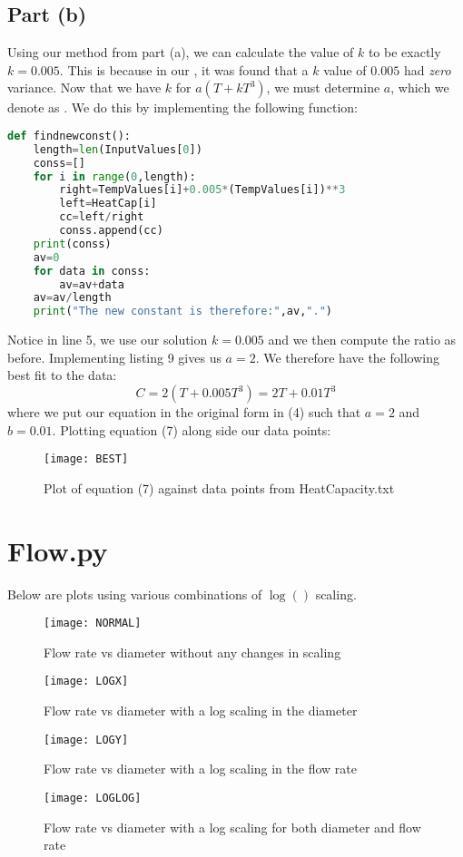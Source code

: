 \documentclass[11pt, oneside]{article}
\begin{document}
\subsection{Part  (b)}
Using our method from part (a), we can calculate the value of $k$ to be exactly $k=0.005$. This is because in our , it was found that a $k$ value of $0.005$ had \textit{zero} variance. Now that we have $k$ for $a(T+kT^3)$, we must determine $a$, which we denote as . We do this by implementing the following function:
\begin{lstlisting}[language=Python, caption=Finding the second constant]
def findnewconst():
	length=len(InputValues[0])
	conss=[]
	for i in range(0,length):
		right=TempValues[i]+0.005*(TempValues[i])**3
		left=HeatCap[i]
		cc=left/right
		conss.append(cc)
	print(conss)
	av=0
	for data in conss:
		av=av+data
	av=av/length
	print("The new constant is therefore:",av,".")
\end{lstlisting}
Notice in line 5, we use our solution $k=0.005$ and we then compute the ratio as before. Implementing listing 9 gives us $a=2$. We therefore have the following best fit to the data:
\begin{equation}
\boxed{C=2(T+0.005T^3)=2T+0.01T^3}
\end{equation}
where we put our equation in the original form in (4) such that $\boxed{a=2}$ and $\boxed{b=0.01}$. Plotting equation (7) along side our data points: 
\begin{figure}[H]
\texttt{[image: BEST]}
\centering
\caption{Plot of equation (7) against data points from HeatCapacity.txt}
\end{figure}
\newpage
\section{Flow.py}
Below are plots using various combinations of $\log()$ scaling. 
\begin{figure}[H]
\texttt{[image: NORMAL]}
\centering
\caption{Flow rate vs diameter without any changes in scaling}
\end{figure}
\begin{figure}[H]
\texttt{[image: LOGX]}
\centering
\caption{Flow rate vs diameter with a log scaling in the diameter}
\end{figure}
\begin{figure}[H]
\texttt{[image: LOGY]}
\centering
\caption{Flow rate vs diameter with a log scaling in the flow rate}
\end{figure}
\begin{figure}[H]
\texttt{[image: LOGLOG]}
\centering
\caption{Flow rate vs diameter with a log scaling for both diameter and flow rate}
\end{figure}
\end{document}
